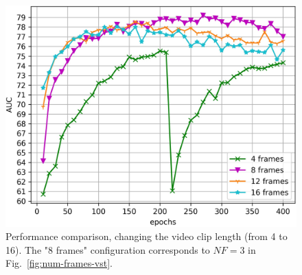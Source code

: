 \begin{figure}[t!]
\centerline{\includegraphics[clip,width=\figsize]{images/exp_3.jpg}}
    \caption{Performance comparison, changing the video clip length (from 4 to 16). The "8 frames" configuration corresponds to $\mathit{NF}=3$ in Fig.~\ref{fig:num-frames-vst}.\label{fig:random-batch}}
\end{figure}




